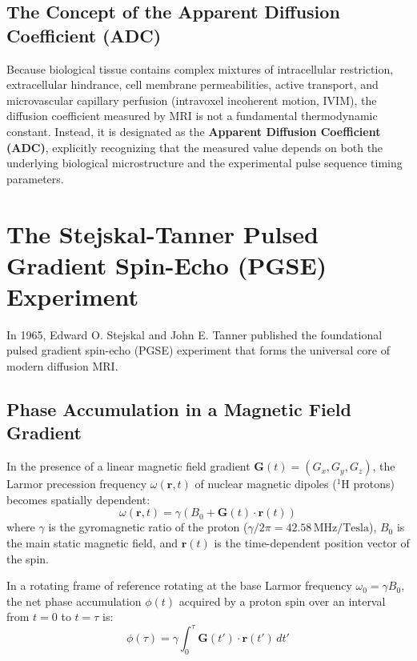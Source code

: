 \documentclass[11pt,a4paper]{article}
\begin{document}
\subsection{The Concept of the Apparent Diffusion Coefficient (ADC)}

Because biological tissue contains complex mixtures of intracellular restriction, extracellular hindrance, cell membrane permeabilities, active transport, and microvascular capillary perfusion (intravoxel incoherent motion, IVIM), the diffusion coefficient measured by MRI is not a fundamental thermodynamic constant. Instead, it is designated as the \textbf{Apparent Diffusion Coefficient (ADC)}, explicitly recognizing that the measured value depends on both the underlying biological microstructure and the experimental pulse sequence timing parameters.

\newpage
\section{The Stejskal-Tanner Pulsed Gradient Spin-Echo (PGSE) Experiment}

In 1965, Edward O. Stejskal and John E. Tanner published the foundational pulsed gradient spin-echo (PGSE) experiment that forms the universal core of modern diffusion MRI.

\subsection{Phase Accumulation in a Magnetic Field Gradient}

In the presence of a linear magnetic field gradient $\mathbf{G}(t) = (G_x, G_y, G_z)$, the Larmor precession frequency $\omega(\mathbf{r}, t)$ of nuclear magnetic dipoles ($^1\text{H}$ protons) becomes spatially dependent:
\begin{equation}
    \omega(\mathbf{r}, t) = \gamma \left( B_0 + \mathbf{G}(t) \cdot \mathbf{r}(t) \right)
\end{equation}
where $\gamma$ is the gyromagnetic ratio of the proton ($\gamma / 2\pi = 42.58\,\text{MHz/Tesla}$), $B_0$ is the main static magnetic field, and $\mathbf{r}(t)$ is the time-dependent position vector of the spin.

In a rotating frame of reference rotating at the base Larmor frequency $\omega_0 = \gamma B_0$, the net phase accumulation $\phi(t)$ acquired by a proton spin over an interval from $t = 0$ to $t = \tau$ is:
\begin{equation}
    \phi(\tau) = \gamma \int_0^\tau \mathbf{G}(t') \cdot \mathbf{r}(t') \, dt'
\end{equation}
\end{document}
